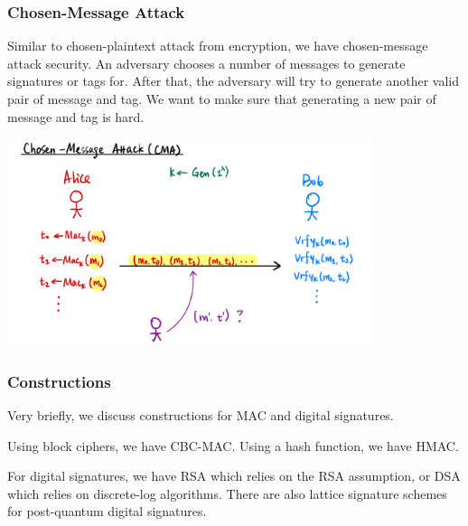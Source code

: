 \subsubsection{Chosen-Message Attack}
Similar to chosen-plaintext attack from encryption, we have chosen-message attack security. An adversary chooses a number of messages to generate signatures or tags for. After that, the adversary will try to generate another valid pair of message and tag. We want to make sure that generating a new pair of message and tag is hard.

\begin{center}
    \includegraphics[width=0.8\textwidth]{images/2023-02-02/cma.png}
\end{center}

\subsubsection{Constructions}
Very briefly, we discuss constructions for MAC and digital signatures.

Using block ciphers, we have CBC-MAC. Using a hash function, we have HMAC.

For digital signatures, we have RSA which relies on the RSA assumption, or DSA which relies on discrete-log algorithms. There are also lattice signature schemes for post-quantum digital signatures.